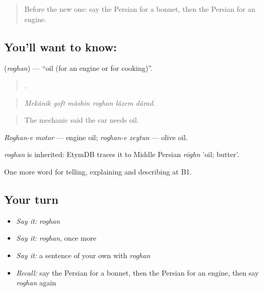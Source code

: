 \label{lesson:FA-C422-roghan}



\begin{quote}
Before the new one: say the Persian for a bonnet, then the Persian for an engine.
\end{quote}

\subsection*{You'll want to know: }
\textbf{} (\emph{roghan}) — \textquotedblleft{}oil (for an engine or for cooking)\textquotedblright{}.

\begin{quote}
     .
\end{quote}

\begin{quote}
\emph{Mekânik goft mâshin roghan lâzem dârad.}
\end{quote}

\begin{quote}
The mechanic said the car needs oil.
\end{quote}

\emph{Roghan-e motor} — engine oil; \emph{roghan-e zeytun} — olive oil.

\begin{cousinweb}
\emph{roghan} is inherited: EtymDB traces it to Middle Persian \emph{rōghn} 'oil; butter'.
\end{cousinweb}

\begin{grammarlens}[title={What you've built}]
One more word for telling, explaining and describing at B1.
\end{grammarlens}

\subsection*{Your turn}
\begin{itemize}
\raggedright
  \item \emph{Say it:} \emph{roghan}
  \item \emph{Say it:} \emph{roghan}, once more
  \item \emph{Say it:} a sentence of your own with \emph{roghan}
  \item \emph{Recall:} say the Persian for a bonnet, then the Persian for an engine, then say \emph{roghan} again
\end{itemize}

